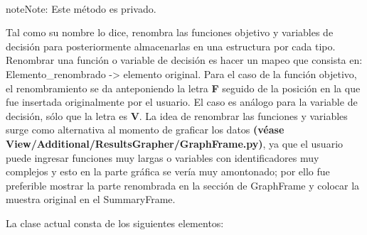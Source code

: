 \documentclass[class=report, crop=false]{standalone}
\begin{document}
\begin{fulllineitems}
\begin{fulllineitems}

~

\begin{notice}{note}{Note:}
Este método es privado.
\end{notice}

Tal como su nombre lo dice, renombra las funciones objetivo y 
variables de decisión para posteriormente almacenarlas en una 
estructura por cada tipo.\break
Renombrar una función o variable de decisión es hacer un mapeo 
que consista en:\break
Elemento\_renombrado -\textgreater{} elemento original.\break
Para el caso de la función objetivo, el renombramiento se da 
anteponiendo la letra \textbf{F} seguido de la posición en la 
que fue insertada originalmente por el usuario.\break
El caso es análogo para la variable de decisión, sólo que la 
letra es \textbf{V}.\break
La idea de renombrar las funciones y variables surge como 
alternativa al momento de graficar los datos \textbf{(véase View/Additional/ResultsGrapher/}\break\textbf{GraphFrame.py)}, 
ya que el usuario puede ingresar funciones muy largas o variables 
con identificadores muy complejos y esto en la parte gráfica se 
vería muy amontonado; por ello fue preferible mostrar la parte 
renombrada en la sección de GraphFrame y colocar la muestra original 
en el SummaryFrame.         

\end{fulllineitems}

\end{fulllineitems}

La clase actual consta de los siguientes elementos:
\end{document}
